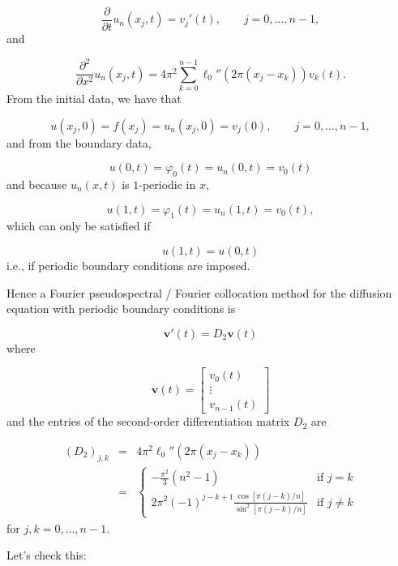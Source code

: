 \documentclass[12pt,landscape]{article}
\begin{document}
{\[
\frac{\partial}{\partial t}u_n(x_j,t) = v_j'(t), \qquad j = 0, \ldots, n-1,
\]
and

\[
\frac{\partial^2}{\partial x^2}u_n(x_j,t) = 4\pi^2 \sum_{k=0}^{n-1}\ell_0''(2\pi (x_j- x_k))v_k(t).
\]
From the initial data, we have that

\[
u(x_j,0) = f(x_j) = u_n(x_j,0) = v_j(0), \qquad j = 0, \ldots, n-1,
\]
and from the boundary data,

\[
u(0,t) = \varphi_0(t) = u_n(0,t) = v_0(t)
\]
and because $u_n(x,t)$ is $1$-periodic in $x$,

\[
u(1,t) = \varphi_1(t) = u_n(1,t) = v_0(t),
\]
which can only be satisfied if

\[
u(1,t) = u(0,t)
\]
i.e., if periodic boundary conditions are imposed.

Hence a Fourier pseudospectral / Fourier collocation method for the diffusion equation with periodic boundary conditions is

\[
\mathbf{v}'(t) = D_2 \mathbf{v}(t)
\]
where

\[
\mathbf{v}(t) = \begin{bmatrix}
v_0(t) \\
\vdots \\
v_{n-1}(t)
\end{bmatrix}
\]
and the entries of the second-order differentiation matrix $D_2$ are


\begin{eqnarray*}
\left(D_2\right)_{j,k} &=& 4\pi^2\ell_0''(2\pi (x_j- x_k)) \\
&=& \begin{cases}
-\frac{\pi^2}{3}\left(n^2 - 1    \right)  & \text{if } j = k\\
\displaystyle{2\pi^2(-1)^{j-k+1}\frac{\cos [\pi (j-k)/n] }{ \sin^2 [\pi (j-k)/n] }} & \text{if } j \neq k
\end{cases}
\end{eqnarray*}
for $j,k = 0, \ldots, n-1$.

Let's check this:


}
\end{document}
